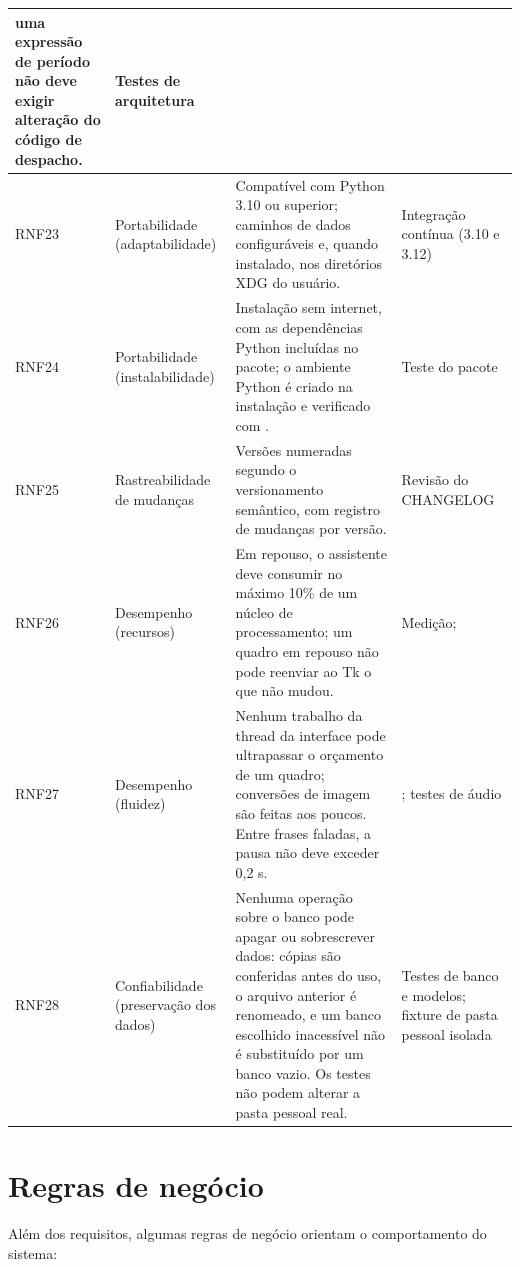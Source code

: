 \begin{singlespace}
\begin{tabularx}{\textwidth}{|C{1.4cm}|P{3.1cm}|L|P{2.8cm}|}
        uma expressão de período não deve exigir alteração do código de despacho. & Testes de arquitetura \\ \hline
RNF23 & Portabilidade (adaptabilidade) & Compatível com Python 3.10 ou superior; caminhos de dados
        configuráveis e, quando instalado, nos diretórios XDG do usuário. & Integração contínua (3.10 e 3.12) \\ \hline
RNF24 & Portabilidade (instalabilidade) & Instalação sem internet, com as dependências Python incluídas no
        pacote; o ambiente Python é criado na instalação e verificado com . & Teste do pacote \\ \hline
RNF25 & Rastreabilidade de mudanças & Versões numeradas segundo o versionamento semântico, com registro de
        mudanças por versão. & Revisão do CHANGELOG \\ \hline
RNF26 & Desempenho (recursos) & Em repouso, o assistente deve consumir no máximo 10\% de um núcleo de
        processamento; um quadro em repouso não pode reenviar ao Tk o que não mudou. & Medição;
         \\ \hline
RNF27 & Desempenho (fluidez) & Nenhum trabalho da thread da interface pode ultrapassar o orçamento de um
        quadro; conversões de imagem são feitas aos poucos. Entre frases faladas, a pausa não deve exceder
        0,2 s. & ; testes de áudio \\ \hline
RNF28 & Confiabilidade (preservação dos dados) & Nenhuma operação sobre o banco pode apagar ou sobrescrever
        dados: cópias são conferidas antes do uso, o arquivo anterior é renomeado, e um banco escolhido
        inacessível não é substituído por um banco vazio. Os testes não podem alterar a pasta pessoal
        real. & Testes de banco e modelos; fixture de pasta pessoal isolada \\ \hline
\end{tabularx}
\end{singlespace}

\section{Regras de negócio}

Além dos requisitos, algumas regras de negócio orientam o comportamento do sistema:

